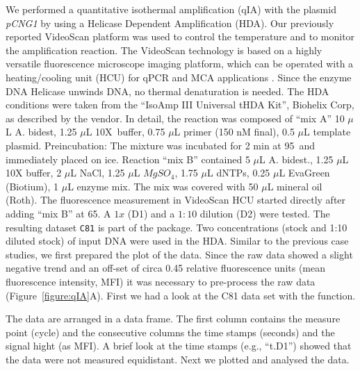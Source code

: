 We performed a quantitative isothermal amplification (qIA) with the plasmid 
\textit{pCNG1} by using a Helicase Dependent Amplification (HDA). Our previously 
reported VideoScan platform \citep{rodiger_highly_2013} was used to control the 
temperature and to monitor the amplification reaction. The VideoScan technology 
is based on a highly versatile fluorescence microscope imaging platform, which 
can be operated with a heating/cooling unit (HCU) for qPCR and MCA applications 
\citep{roediger_RJ_2013, rodiger_highly_2013}. Since the enzyme DNA Helicase 
unwinds DNA, no thermal denaturation is needed. The HDA conditions were taken 
from the ``IsoAmp III Universal tHDA Kit'', Biohelix Corp, as described by the 
vendor. In detail, the reaction was composed of ``mix A'' 10 $\mu$L A. bidest, 
1.25 $\mu$L 10X~buffer, 0.75 $\mu$L primer (150 nM final), 0.5 $\mu$L template 
plasmid. Preincubation: The mixture was incubated for 2 min at 
95\textcelsius~and immediately placed on ice. Reaction ``mix B'' contained 5 
$\mu$L A. bidest., 1.25 $\mu$L 10X buffer, 2 $\mu$L NaCl, 1.25 $\mu$L 
$MgSO_{4}$, 1.75 $\mu$L dNTPs, 0.25 $\mu$L EvaGreen (Biotium), 1 $\mu$L enzyme 
mix. The mix was covered with 50 $\mu$L mineral oil (Roth). The fluorescence 
measurement in VideoScan HCU started directly after adding ``mix B'' at 
65\textcelsius. A $1x$ (D1) and a $1:10$ dilution (D2) were tested. The 
resulting dataset \texttt{C81} is part of the  package. Two 
concentrations (stock and 1:10 diluted stock) of input DNA were used in the HDA. 
Similar to the previous case studies, we first prepared the plot of the data. 
Since the raw data showed a slight negative trend and an off-set of circa 0.45 
relative fluorescence units (mean fluorescence intensity, MFI) it was necessary 
to pre-process the raw data (Figure~\ref{figure:qIA}A). First we had a look at 
the C81 data set with the  function.


The data are arranged in a data frame. The first column contains the measure 
point (cycle) and the consecutive columns the time stamps (seconds) and the 
signal hight (as MFI). A brief look at the time stamps (e.g., ``t.D1'') showed 
that the data were not measured equidistant. Next we plotted and analysed the 
data. 

